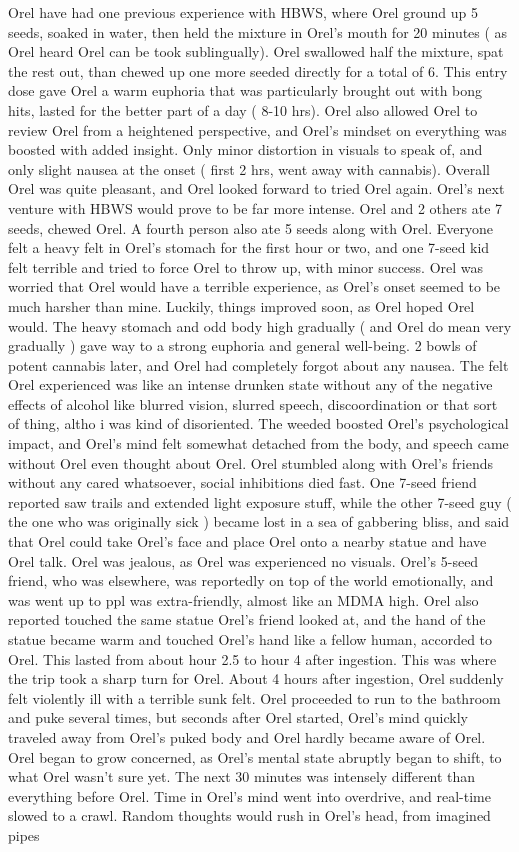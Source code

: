 \documentclass[12pt]{book}
\begin{document}
Orel have had one previous experience with HBWS, where Orel ground up 5 seeds, soaked in water, then held the mixture in Orel's mouth for 20 minutes ( as Orel heard Orel can be took sublingually). Orel swallowed half the mixture, spat the rest out, than chewed up one more seeded directly for a total of 6. This entry dose gave Orel a warm euphoria that was particularly brought out with bong hits, lasted for the better part of a day ( 8-10 hrs). Orel also allowed Orel to review Orel from a heightened perspective, and Orel's mindset on everything was boosted with added insight. Only minor distortion in visuals to speak of, and only slight nausea at the onset ( first 2 hrs, went away with cannabis). Overall Orel was quite pleasant, and Orel looked forward to tried Orel again. Orel's next venture with HBWS would prove to be far more intense. Orel and 2 others ate 7 seeds, chewed Orel. A fourth person also ate 5 seeds along with Orel. Everyone felt a heavy felt in Orel's stomach for the first hour or two, and one 7-seed kid felt terrible and tried to force Orel to throw up, with minor success. Orel was worried that Orel would have a terrible experience, as Orel's onset seemed to be much harsher than mine. Luckily, things improved soon, as Orel hoped Orel would. The heavy stomach and odd body high gradually ( and Orel do mean very gradually ) gave way to a strong euphoria and general well-being. 2 bowls of potent cannabis later, and Orel had completely forgot about any nausea. The felt Orel experienced was like an intense drunken state without any of the negative effects of alcohol like blurred vision, slurred speech, discoordination or that sort of thing, altho i was kind of disoriented. The weeded boosted Orel's psychological impact, and Orel's mind felt somewhat detached from the body, and speech came without Orel even thought about Orel. Orel stumbled along with Orel's friends without any cared whatsoever, social inhibitions died fast. One 7-seed friend reported saw trails and extended light exposure stuff, while the other 7-seed guy ( the one who was originally sick ) became lost in a sea of gabbering bliss, and said that Orel could take Orel's face and place Orel onto a nearby statue and have Orel talk. Orel was jealous, as Orel was experienced no visuals. Orel's 5-seed friend, who was elsewhere, was reportedly on top of the world emotionally, and was went up to ppl was extra-friendly, almost like an MDMA high. Orel also reported touched the same statue Orel's friend looked at, and the hand of the statue became warm and touched Orel's hand like a fellow human, accorded to Orel. This lasted from about hour 2.5 to hour 4 after ingestion. This was where the trip took a sharp turn for Orel. About 4 hours after ingestion, Orel suddenly felt violently ill with a terrible sunk felt. Orel proceeded to run to the bathroom and puke several times, but seconds after Orel started, Orel's mind quickly traveled away from Orel's puked body and Orel hardly became aware of Orel. Orel began to grow concerned, as Orel's mental state abruptly began to shift, to what Orel wasn't sure yet. The next 30 minutes was intensely different than everything before Orel. Time in Orel's mind went into overdrive, and real-time slowed to a crawl. Random thoughts would rush in Orel's head, from imagined pipes 
\end{document}
